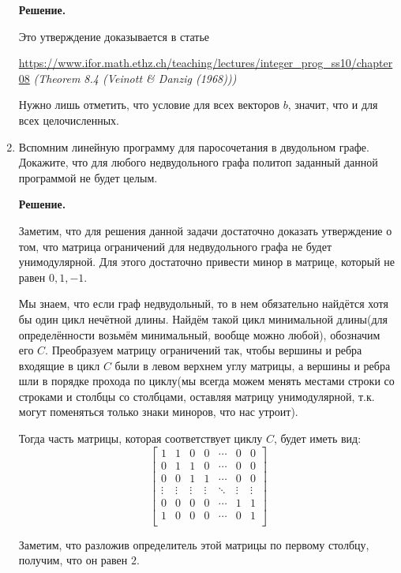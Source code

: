 \begin{enumerate}
	\textbf{Решение.}
	
	Это утверждение доказывается в статье 
	
	\url{https://www.ifor.math.ethz.ch/teaching/lectures/integer_prog_ss10/chapter08} \textit{(Theorem 8.4 
		(Veinott \& Danzig (1968)))}
	
	Нужно лишь отметить, что условие для всех векторов $b$, значит, что и для всех целочисленных.
	
	\item Вспомним линейную программу для паросочетания в двудольном графе. Докажите, что для любого 
	недвудольного графа политоп заданный данной программой не будет целым.
	
	\textbf{Решение.}
	
	Заметим, что для решения данной задачи достаточно доказать утверждение о том, что матрица ограничений для 
	недвудольного графа не будет унимодулярной. Для этого достаточно привести минор в матрице, который не равен 
	$0, 1, -1$.
	
	Мы знаем, что если граф недвудольный, то в нем обязательно найдётся хотя бы один цикл нечётной длины. Найдём 
	такой цикл минимальной длины(для определённости возьмём минимальный, вообще можно любой), обозначим его $C$. 
	Преобразуем матрицу ограничений так, чтобы вершины и ребра входящие в цикл $C$ были в левом верхнем углу 
	матрицы, а вершины и ребра шли в порядке прохода по циклу(мы всегда можем менять местами строки со строками и 
	столбцы со столбцами, оставляя матрицу унимодулярной, т.к. могут поменяться только знаки миноров, что нас 
	утроит). 
	
	Тогда часть матрицы, которая соответствует циклу $C$, будет иметь вид:
	\begin{equation*}
		\begin{bmatrix}
		1 & 1 & 0 & 0 & \cdots & 0 & 0\\
		0 & 1 & 1 & 0 & \cdots & 0 & 0\\ 
		0 & 0 & 1 & 1 & \cdots & 0 & 0\\  
		\vdots & \vdots & \vdots & \vdots & \ddots & \vdots & \vdots\\
		0 & 0 & 0 & 0 & \cdots & 1 & 1 \\
		1 & 0 & 0 & 0 & \cdots & 0 & 1 \\
		\end{bmatrix}
	\end{equation*}
	
	Заметим, что разложив определитель этой матрицы по первому столбцу, получим, что он равен $2$. 
	

\end{enumerate}

